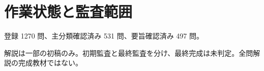 \chapter{作業状態と監査範囲}
登録 1270 問、主分類確認済み 531 問、要旨確認済み 497 問。
\par 解説は一部の初稿のみ。初期監査と最終監査を分け、最終完成は未判定。全問解説の完成教材ではない。
